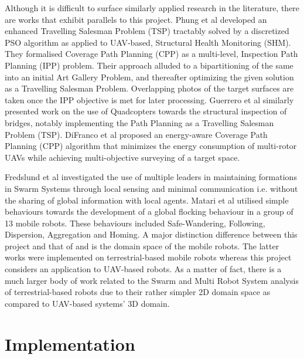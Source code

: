 \documentclass{report}
\begin{document}
Although it is difficult to surface similarly applied research in the literature, there are works that exhibit parallels to this project. Phung et al \cite{Phung2017} developed an enhanced Travelling Salesman Problem (TSP) tractably solved by a discretized PSO algorithm as applied to UAV-based, Structural Health Monitoring (SHM). They formalised Coverage Path Planning (CPP) as a multi-level, Inspection Path Planning (IPP) problem. Their approach alluded to a bipartitioning of the same into an initial Art Gallery Problem, and thereafter optimizing the given solution as a Travelling Salesman Problem. Overlapping photos of the target surfaces are taken once the IPP objective is met for later processing. Guerrero et al \cite{Guerrero2013} similarly presented work on the use of Quadcopters towards the structural inspection of bridges, notably implementing the Path Planning as a Travelling Salesman Problem (TSP). DiFranco et al \cite{DiFranco2015} proposed an energy-aware Coverage Path Planning (CPP) algorithm that minimizes the energy consumption of multi-rotor UAVs while achieving multi-objective surveying of a target space.

Fredslund et al \cite{Fredslund2002} investigated the use of multiple leaders in maintaining formations in Swarm Systems through local sensing and minimal communication i.e. without the sharing of global information with local agents. Matari et al \cite{Matari1995} utilised simple behaviours towards the development of a global flocking behaviour in a group of 13 mobile robots. These behaviours included Safe-Wandering, Following, Dispersion, Aggregation and Homing. A major distinction difference between this project and that of \cite{Matari1995} and \cite{Fredslund2002} is the domain space of the mobile robots. The latter works were implemented on terrestrial-based mobile robots whereas this project considers an application to UAV-based robots. As a matter of fact, there is a much larger body of work related to the Swarm and Multi Robot System analysis of terrestrial-based robots due to their rather simpler 2D domain space as compared to UAV-based systems' 3D domain.

\chapter{Implementation} \label{implementation}
\end{document}
